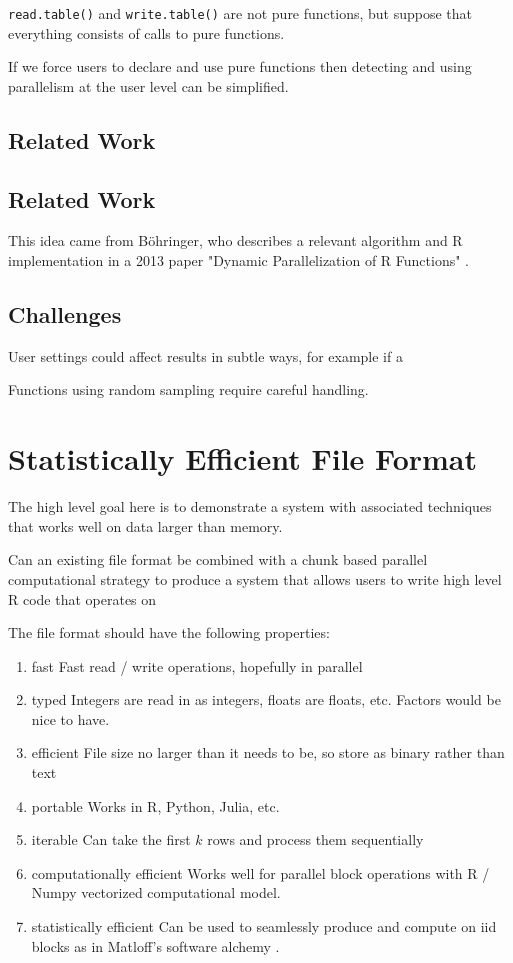 \documentclass[12pt]{article}
\begin{document}
\texttt{read.table()} and \texttt{write.table()} are not pure functions,
but suppose that everything consists of calls to pure functions.

If we force users to declare and use pure functions
 then detecting and using parallelism at the user
level can be simplified.  \subsection{Related Work}

\subsection{Related Work}

This idea came from Böhringer, who describes a relevant algorithm and
R implementation in a 2013 paper "Dynamic Parallelization of R Functions"
\cite{bohringer2013dynamic}.

\subsection{Challenges}

User settings could affect results in subtle ways, for example if a 

Functions using random sampling require careful handling.

\section{Statistically Efficient File Format}

The high level goal here is to demonstrate a system with associated
techniques that works well on data larger than memory.

Can an existing file format be combined with a chunk based parallel
computational strategy to produce a system that allows users to write high
level R code that operates on 

The file format should
have the following properties:

\begin{enumerate}
    \item{fast} Fast read / write operations, hopefully in parallel
    \item{typed} Integers are read in as integers, floats are floats, etc.
        Factors would be nice to have.
    \item{efficient} File size no larger than it needs to be, so store as
        binary rather than text
    \item{portable} Works in R, Python, Julia, etc.
    \item{iterable} Can take the first $k$ rows and process them
        sequentially
    \item{computationally efficient} Works well for parallel block
        operations with R / Numpy vectorized computational model.
    \item{statistically efficient} Can be used to seamlessly produce and
        compute on iid blocks as in Matloff's
        software alchemy \cite{matloff2014software}.
\end{enumerate}
\end{document}
